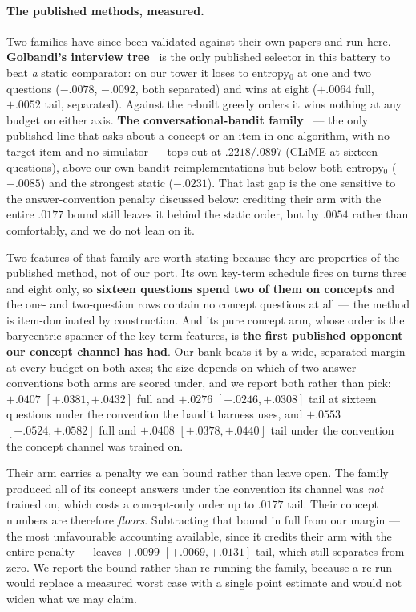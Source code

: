 \documentclass[11pt]{article}
\begin{document}
\paragraph{The published methods, measured.} Two families have since been validated against
their own papers and run here. \textbf{Golbandi's interview tree}~\cite{golbandi2011adaptive} is the
only published selector in this battery to beat \emph{a} static comparator: on our tower it loses to
entropy$_0$ at one and two questions ($-.0078$, $-.0092$, both separated) and wins at eight
($+.0064$ full, $+.0052$ tail, separated). Against the rebuilt greedy orders it wins nothing at any
budget on either axis. \textbf{The conversational-bandit
family}~\cite{zhang2020conucb,wang2023conlinucb,liu2025clisk} ---
the only published line that asks about a concept or an item in one algorithm, with no target item
and no simulator --- tops out at $.2218/.0897$ (CLiME at sixteen questions), above our own bandit
reimplementations but below both entropy$_0$ ($-.0085$) and the strongest static ($-.0231$). That
last gap is the one sensitive to the answer-convention penalty discussed below: crediting their arm
with the entire $.0177$ bound still leaves it behind the static order, but by $.0054$ rather than
comfortably, and we do not lean on it.

Two features of that family are worth stating because they are properties of the published
method, not of our port. Its own key-term schedule fires on turns three and eight only, so
\textbf{sixteen questions spend two of them on concepts} and the one- and two-question rows contain
no concept questions at all --- the method is item-dominated by construction. And its pure concept
arm, whose order is the barycentric spanner of the key-term features, is \textbf{the first
published opponent our concept channel has had}. Our bank beats it by a wide, separated margin at
every budget on both axes; the size depends on which of two answer conventions both arms are scored
under, and we report both rather than pick: $+.0407$ $[+.0381,+.0432]$ full and $+.0276$
$[+.0246,+.0308]$ tail at sixteen questions under the convention the bandit harness uses, and
$+.0553$ $[+.0524,+.0582]$ full and $+.0408$ $[+.0378,+.0440]$ tail under the convention the
concept channel was trained on.

Their arm carries a penalty we can bound rather than leave open. The family produced all of its
concept answers under the convention its channel was \emph{not} trained on, which costs a
concept-only order up to $.0177$ tail. Their concept numbers are therefore \emph{floors}. Subtracting
that bound in full from our margin --- the most unfavourable accounting available, since it credits
their arm with the entire penalty --- leaves $+.0099$ $[+.0069,+.0131]$ tail, which still separates
from zero. We report the bound rather than re-running the family, because a re-run would replace a
measured worst case with a single point estimate and would not widen what we may claim.
\end{document}

